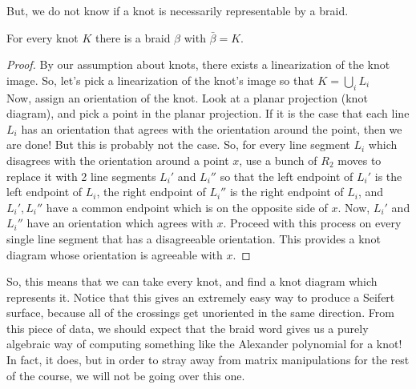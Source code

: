 But, we do not know if a knot is necessarily representable by a braid. 
\begin{theorem}[Alexander]
For every knot $K$ there is a braid $\beta$ with $\bar \beta = K$. 
\end{theorem}
\begin{proof}
By our assumption about knots, there exists a linearization of the knot image. So, let's pick a linearization of the knot's image so that $K=\bigcup_i L_i$\\
Now, assign an orientation of the knot. Look at a planar projection (knot diagram), and pick a point in the planar projection. If it is the case that each line $L_i$ has an orientation that agrees with the orientation around the point, then we are done! But this is probably not the case. So, for every line segment $L_i$ which disagrees with the orientation around a point $x$, use a bunch of $R_2$ moves to replace it with 2 line segments $L_i'$ and $L_i''$ so that the left endpoint of $L_i'$ is the left endpoint of $L_i$, the right endpoint of $L_i''$ is the right endpoint of $L_i$, and $L_i', L_i''$ have a common endpoint which is on the opposite side of $x$. Now, $L_i'$ and $L_i''$ have an orientation which agrees with $x$. Proceed with this process on every single line segment that has a disagreeable orientation. This provides a knot diagram whose orientation is agreeable with $x$. 
\end{proof}
So, this means that we can take every knot, and find a knot diagram which represents it. Notice that this gives an extremely easy way to produce a Seifert surface, because all of the crossings get unoriented in the same direction. From this piece of data, we should expect that the braid word gives us a purely algebraic way of computing something like the Alexander polynomial for a knot! In fact, it does, but in order to stray away from matrix manipulations for the rest of the course, we will not be going over this one.
